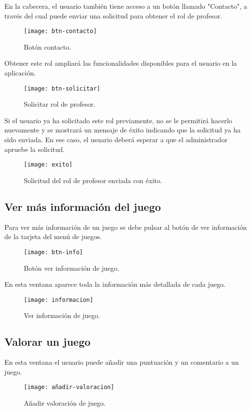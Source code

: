 En la cabecera, el usuario también tiene acceso a un botón llamado "Contacto", a través del cual puede enviar una solicitud para obtener el rol de profesor. 
\begin{figure}[htb]
\centering
\texttt{[image: btn-contacto]}
\caption{Botón contacto.}
\label{fig:btn-contacto}
\end{figure}

Obtener este rol ampliará las funcionalidades disponibles para el usuario en la aplicación. 

\begin{figure}[htb]
\centering
\texttt{[image: btn-solicitar]}
\caption{Solicitar rol de profesor.}
\label{fig:btn-solicitar}
\end{figure}

Si el usuario ya ha solicitado este rol previamente, no se le permitirá hacerlo nuevamente y se mostrará un mensaje de éxito indicando que la solicitud ya ha sido enviada. En ese caso, el usuario deberá esperar a que el administrador apruebe la solicitud.
\begin{figure}[htb]
\centering
\texttt{[image: exito]}
\caption{Solicitud del rol de profesor enviada con éxito.}
\label{fig:exito}
\end{figure}

\subsection{Ver más información del juego}
Para ver más información de un juego se debe pulsar al botón de ver información de la tarjeta del menú de juegos.
\begin{figure}[htb]
\centering
\texttt{[image: btn-info]}
\caption{Botón ver información de juego.}
\label{fig:btn-info}
\end{figure}

En esta ventana aparece toda la información más detallada de cada juego.
\newpage
\begin{figure}[htb]
\centering
\texttt{[image: informacion]}
\caption{Ver información de juego.}
\label{fig:informacion}
\end{figure}

\subsection{Valorar un juego}
En esta ventana el usuario puede añadir una puntuación y un comentario a un juego.
\begin{figure}[htb]
\centering
\texttt{[image: añadir-valoracion]}
\caption{Añadir valoración de juego.}
\label{fig:añadir-valoracion}
\end{figure}

